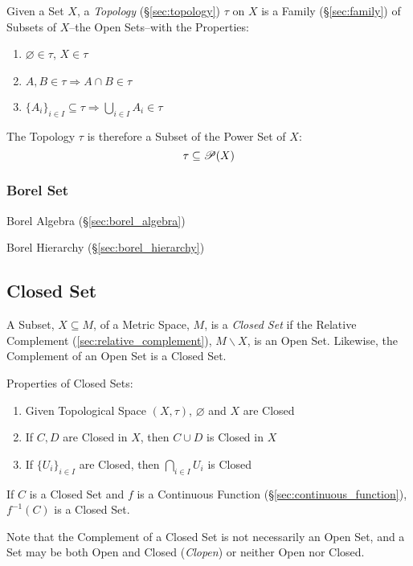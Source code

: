 Given a Set $X$, a \emph{Topology} (\S\ref{sec:topology}) $\tau$ on $X$ is a
Family (\S\ref{sec:family}) of Subsets of $X$--the Open Sets--with the
Properties:
\begin{enumerate}
  \item $\varnothing \in \tau$, $X \in \tau$
  \item $A,B \in \tau \Rightarrow A \cap B \in \tau$
  \item $\{A_i\}_{i \in I} \subseteq \tau \Rightarrow \bigcup_{i \in
  I} A_i \in \tau$
\end{enumerate}
The Topology $\tau$ is therefore a Subset of the Power Set of $X$:
\[
  \tau \subseteq \mathscr{P}(X)
\]



\subsubsection{Borel Set}\label{sec:borel_set}

Borel Algebra (\S\ref{sec:borel_algebra})

Borel Hierarchy (\S\ref{sec:borel_hierarchy})



\subsection{Closed Set}\label{sec:closed_set}

A Subset, $X \subseteq M$, of a Metric Space, $M$, is a \emph{Closed
  Set} if the Relative Complement (\ref{sec:relative_complement}), $M
\backslash X$, is an Open Set. Likewise, the Complement of an Open Set
is a Closed Set.

Properties of Closed Sets:
\begin{enumerate}
  \item Given Topological Space $(X, \tau)$, $\varnothing$ and $X$ are
    Closed
  \item If $C, D$ are Closed in $X$, then $C \cup D$ is Closed in $X$
  \item If $\{ U_i \}_{i \in I}$ are Closed, then $\bigcap_{i \in I}
  U_i$ is Closed
\end{enumerate}

If $C$ is a Closed Set and $f$ is a Continuous Function
(\S\ref{sec:continuous_function}), $f^{-1}(C)$ is a Closed Set.

\fist Note that the Complement of a Closed Set is not
necessarily an Open Set, and a Set may be both Open and Closed
(\emph{Clopen}) or neither Open nor Closed.

